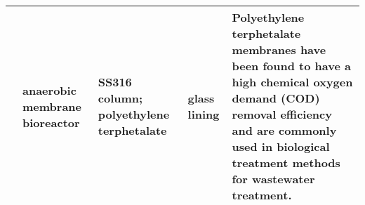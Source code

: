 {\begin{tabular}{@{}lp{5cm}p{2cm}p{2cm}p{12cm}@{}}
                                                      & anaerobic membrane bioreactor                          & SS316 column; polyethylene terphetalate                                                 & glass lining                                      & Polyethylene terphetalate membranes have been found to have a high chemical oxygen demand (COD) removal efficiency and are commonly used in biological treatment methods for wastewater treatment\cite{madaeni_screening_2006}.                                                                                                                                                                                                                                                                                                                                                                                                                                                                                                                                                                                                                                                                                                                  \\ \bottomrule
\end{tabular}%
}